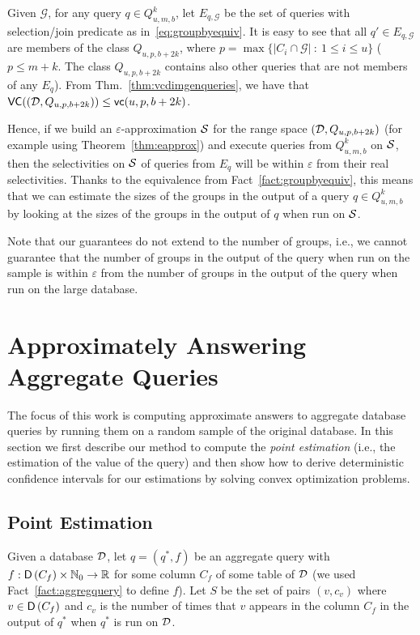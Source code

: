 Given $\mathcal{G}$, for any query $q\in Q^k_{u,m,b}$, let $E_{q,\mathcal{G}}$
be the set of queries with selection/join predicate as
in~\eqref{eq:groupbyequiv}. It is easy to see that all $q'\in E_{q,\mathcal{G}}$
are members of the class $Q_{u,p,b+2k}$, where $p=\max\{|C_i\cap\mathcal{G}|
~:~ 1\le i\le u\}$ ($p\le m+k$. The class $Q_{u,p,b+2k}$ contains also other
queries that are not members of any $E_q$). From Thm.~\ref{thm:vcdimgenqueries},
we have that $\mathsf{VC}(({\cal D},Q_{u,p,b+2k}))\le\mathsf{vc}(u,p,b+2k)$.

Hence, if we build an $\varepsilon$-approximation ${\cal S}$ for the range space
$({\cal D},Q_{u,p,b+2k})$ (for example using Theorem~\ref{thm:eapprox}) and execute
queries from $Q^k_{u,m,b}$ on ${\cal S}$, then the selectivities on ${\cal S}$ of queries
from $E_q$ will be within $\varepsilon$ from their real selectivities. Thanks to
the equivalence from Fact~\ref{fact:groupbyequiv}, this means that we can
estimate the sizes of the groups in the output of a query $q\in Q^k_{u,m,b}$ by
looking at the sizes of the groups in the output of $q$ when run on ${\cal S}$.


Note that our guarantees do not extend to the number of groups, i.e., we cannot
guarantee that the number of groups in the output of the query when run on the
sample is within $\varepsilon$ from the number of groups in the output of the
query when run on the large database.

\section{Approximately Answering Aggregate Queries}\label{sec:aggreg}
The focus of this work is computing approximate answers to aggregate database
queries by running them on a random sample of the original database. In this
section we first describe our method to compute the \emph{point estimation}
(i.e., the estimation of the value of the query) and then show how to derive
deterministic confidence intervals for our estimations by solving convex
optimization problems.

\subsection{Point Estimation}\label{sec:pointest}
Given a database ${\cal D}$, let $q=(q^*,f)$ be an aggregate query with
$f:\mathsf{D}\left(C_f\right)\times\mathbb{N}_0\to\mathbb{R}$ for some column $C_f$ of some
table of ${\cal D}$ (we used Fact~\ref{fact:aggregquery} to define $f$). Let $S$ be the
set of pairs $(v,c_v)$ where $v\in \mathsf{D}\left(C_f\right)$ and $c_v$ is the number of times
that $v$ appears in the column $C_f$ in the output of $q^*$ when $q^*$ is run on
${\cal D}$.

